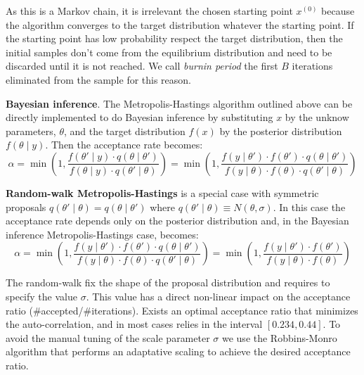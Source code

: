 \documentclass[11pt,fleqn]{book} %
\begin{document}
As this is a Markov chain, it is irrelevant the chosen starting point 
$x^{(0)}$ because the algorithm converges to the target distribution
whatever the starting point. If the starting point has low probability 
respect the target distribution, then the initial samples don't come 
from the equilibrium distribution and need to be discarded until it is 
not reached. We call \emph{burnin period} the first $B$ iterations 
eliminated from the sample for this reason.

\textbf{Bayesian inference}.
The Metropolis-Hastings algorithm outlined above can be directly implemented to do
Bayesian inference by substituting $x$ by the unknow parameters, $\theta$, and 
the target distribution $f(x)$ by the posterior distribution $f(\theta \mid y)$. Then 
the acceptance rate becomes:
\begin{displaymath}
	\alpha = \min\left(1,\frac{f(\theta' \mid y) \cdot q(\theta \mid \theta')}{f(\theta \mid y) \cdot q(\theta' \mid \theta)}\right) = \min\left(1,\frac{f(y \mid \theta') \cdot f(\theta') \cdot q(\theta \mid \theta')}{f(y \mid \theta)  \cdot f(\theta) \cdot q(\theta' \mid \theta)}\right)
\end{displaymath}

\textbf{Random-walk Metropolis-Hastings} is a special case with symmetric proposals
$q(\theta' \mid \theta) = q(\theta \mid \theta')$ where $q(\theta' \mid \theta) \equiv N(\theta,\sigma)$. 
In this case the acceptance rate depends only on the posterior distribution
and, in the Bayesian inference Metropolis-Hastings case, becomes:
\begin{displaymath}
	\alpha = 
	\min\left(1,\frac{f(y \mid \theta') \cdot f(\theta') \cdot q(\theta \mid \theta')}{f(y \mid \theta)  \cdot f(\theta) \cdot q(\theta' \mid \theta)}\right) = 
	\min\left(1,\frac{f(y \mid \theta') \cdot f(\theta')}{f(y \mid \theta) \cdot f(\theta)}\right)
\end{displaymath}

The random-walk fix the shape of the proposal distribution and requires 
to specify the value $\sigma$. This value has a direct non-linear impact 
on the acceptance ratio (\#accepted/\#iterations). Exists an optimal 
acceptance ratio that minimizes the auto-correlation, and in most cases 
relies in the interval $[0.234,0.44]$. To avoid the  manual tuning of the 
scale parameter $\sigma$ we use the Robbins-Monro algorithm \cite{garthwaite:2010} 
that performs an adaptative scaling to achieve the desired acceptance ratio.
\end{document}
